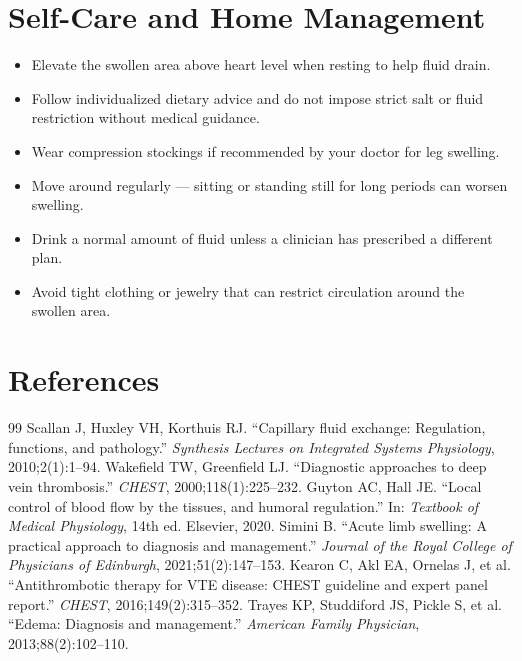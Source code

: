\section*{Self-Care and Home Management}
\begin{itemize}
  \item Elevate the swollen area above heart level when resting to help fluid drain.
  \item Follow individualized dietary advice and do not impose strict salt or fluid restriction without medical guidance.
  \item Wear compression stockings if recommended by your doctor for leg swelling.
  \item Move around regularly — sitting or standing still for long periods can worsen swelling.
  \item Drink a normal amount of fluid unless a clinician has prescribed a different plan.
  \item Avoid tight clothing or jewelry that can restrict circulation around the swollen area.
\end{itemize}

\section*{References}
\begin{thebibliography}{99}
 Scallan J, Huxley VH, Korthuis RJ. ``Capillary fluid exchange: Regulation, functions, and pathology.'' \textit{Synthesis Lectures on Integrated Systems Physiology}, 2010;2(1):1--94.
 Wakefield TW, Greenfield LJ. ``Diagnostic approaches to deep vein thrombosis.'' \textit{CHEST}, 2000;118(1):225--232.
 Guyton AC, Hall JE. ``Local control of blood flow by the tissues, and humoral regulation.'' In: \textit{Textbook of Medical Physiology}, 14th ed. Elsevier, 2020.
 Simini B. ``Acute limb swelling: A practical approach to diagnosis and management.'' \textit{Journal of the Royal College of Physicians of Edinburgh}, 2021;51(2):147--153.
 Kearon C, Akl EA, Ornelas J, et al. ``Antithrombotic therapy for VTE disease: CHEST guideline and expert panel report.'' \textit{CHEST}, 2016;149(2):315--352.
 Trayes KP, Studdiford JS, Pickle S, et al. ``Edema: Diagnosis and management.'' \textit{American Family Physician}, 2013;88(2):102--110.
\end{thebibliography}
